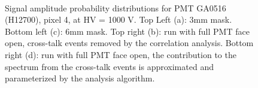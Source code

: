 \begin{figure}[hb] 
\centering 
  \hfill
   \\
  \hfill
  \caption{Signal amplitude probability distributions for PMT GA0516 (H12700), pixel 4, at HV = 1000 V. Top Left (a): 3mm mask. Bottom left (c): 6mm mask. Top right (b): run with full PMT face open, cross-talk events removed by the correlation analysis. Bottom right (d): run with full PMT face open, the contribution to the spectrum from the cross-talk events is approximated and parameterized by the analysis algorithm.
    }
\label{fig:GA0516_1}
\end{figure}

